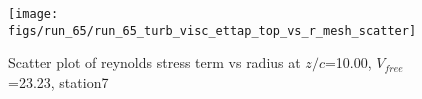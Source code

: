 \begin{figure}[H]
\centering
\texttt{[image: figs/run\_65/run\_65\_turb\_visc\_ettap\_top\_vs\_r\_mesh\_scatter]}
\caption{Scatter plot of reynolds stress term vs radius at $z/c$=10.00, $V_{free}$=23.23, station7}
\label{fig:run_65_turb_visc_ettap_top_vs_r_mesh_scatter}
\end{figure}


